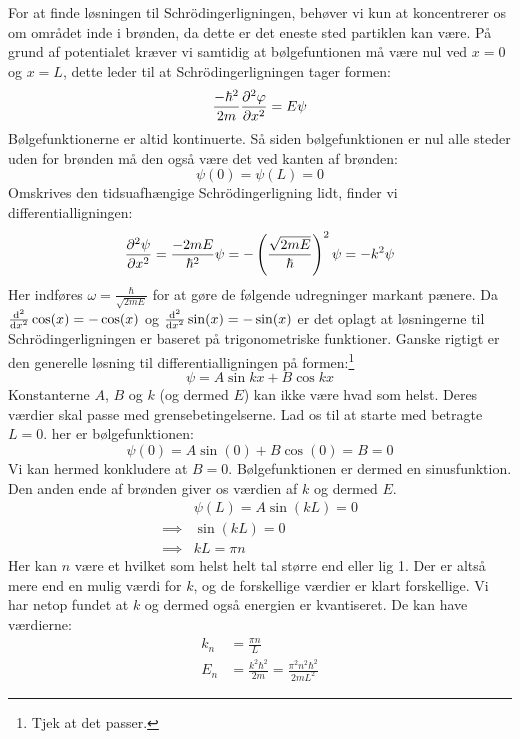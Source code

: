 \documentclass[../Kvantemekanik.tex]{subfiles}
\begin{document}
For at finde løsningen til Schrödingerligningen, behøver vi kun at koncentrerer os om området inde i brønden, da dette er det eneste sted partiklen kan være. På grund af potentialet kræver vi samtidig at bølgefuntionen må være nul ved $x=0$ og $x=L$, dette leder til at Schrödingerligningen tager formen:
\begin{equation}
    \frac{-\hbar^2}{2m}\pdif[2]{x}\phi=E\psi
    \label{kvant:eq:infb}
\end{equation}
Bølgefunktionerne er altid kontinuerte. Så siden bølgefunktionen er nul alle steder uden for brønden må den også være det ved kanten af brønden:
$$
\psi(0)=\psi(L) = 0
$$
Omskrives den tidsuafhængige Schrödingerligning lidt, finder vi differentialligningen:
\begin{equation}
\pdif[2]{x}\psi = \frac{-2mE}{\hbar^2}\psi = -\left(\frac{\sqrt{2mE}}{\hbar}\right)^2\psi = -k^2\psi
\end{equation}
Her indføres $\omega = \frac{\hbar}{\sqrt{2mE}}$ for at gøre de følgende udregninger markant pænere.
Da $\dif[2]{x}{}\cos(x) = -\cos(x)$ og $\dif[2]{x}{}\sin(x) = -\sin(x)$ er det oplagt at løsningerne til Schrödingerligningen er baseret på trigonometriske funktioner. Ganske rigtigt er den generelle løsning til differentialligningen på formen:\footnote{Tjek at det passer.}
\begin{equation}
\psi = A\sin k x+B\cos k x
\end{equation}
Konstanterne $A$, $B$ og $k$ (og dermed $E$) kan ikke være hvad som helst. Deres værdier skal passe med grensebetingelserne. Lad os til at starte med betragte $L=0$. her er bølgefunktionen:
\begin{equation}
\psi(0) = A\sin(0)+B\cos(0) = B = 0
\end{equation}
Vi kan hermed konkludere at $B=0$. Bølgefunktionen er dermed en sinusfunktion.
Den anden ende af brønden giver os værdien af $k$ og dermed $E$. 
\begin{align*}
&\psi(L) = A\sin(k L) = 0\\
\implies &\sin(k L) = 0\\
\implies &k L = \pi n
\end{align*}
Her kan $n$ være et hvilket som helst helt tal større end eller lig 1. Der er altså mere end en mulig værdi for $k$, og de forskellige værdier er klart forskellige. Vi har netop fundet at $k$ og dermed også energien er kvantiseret. De kan have værdierne:
\begin{align}
k_n &= \frac{\pi n}{L}\\
E_n &= \frac{k^2\hbar^2}{2m} = \frac{\pi^2n^2\hbar^2}{2mL^2}
\end{align}
\end{document}
